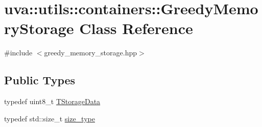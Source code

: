 \hypertarget{classuva_1_1utils_1_1containers_1_1_greedy_memory_storage}{}\section{uva\+:\+:utils\+:\+:containers\+:\+:Greedy\+Memory\+Storage Class Reference}
\label{classuva_1_1utils_1_1containers_1_1_greedy_memory_storage}


{\ttfamily \#include $<$greedy\+\_\+memory\+\_\+storage.\+hpp$>$}

\subsection*{Public Types}
\begin{DoxyCompactItemize}
\item 
typedef uint8\+\_\+t \hyperlink{classuva_1_1utils_1_1containers_1_1_greedy_memory_storage_a95e609975aae9cc91eab204b5d1d2b2b}{T\+Storage\+Data}
\item 
typedef std\+::size\+\_\+t \hyperlink{classuva_1_1utils_1_1containers_1_1_greedy_memory_storage_a750d36c7e6c18135ccc45bf105f860e5}{size\+\_\+type}
\end{DoxyCompactItemize}
